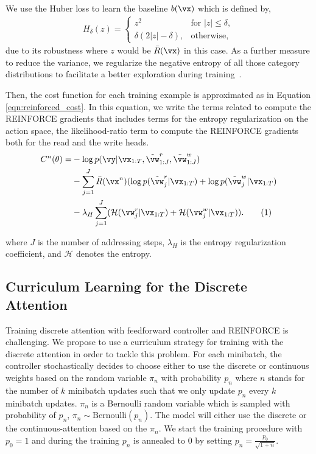 \documentclass[12pt]{article}
\newcommand\numberthis{\addtocounter{equation}{1}\tag{\theequation}}
\begin{document}
We use the Huber loss to learn the baseline $b(\vx)$ which is defined by,
\begin{align*}
    H_{\delta}(z) = 
    \begin{cases}
 {z^2}                   & \text{for } |z| \le \delta, \\
 \delta (2|z| - \delta), & \text{otherwise,}
\end{cases}
\end{align*}
due to its robustness where $z$ would be $\bar{R}(\vx)$ in this case.
As a further measure to reduce the variance, we regularize
the negative entropy of all those category distributions to facilitate a
better exploration during training~\citep{xu2015show}.

Then, the cost function for each training example is approximated as in Equation \eqref{eqn:reinforced_cost}. In this equation, we write the terms related to compute the REINFORCE gradients that includes terms for the entropy regularization on the action space, the likelihood-ratio term to compute the REINFORCE gradients both for the read and the write heads.
\begin{align*}
    C^n(\theta) =& -\log p(\vy|\vx_{1:T},
    \tilde{\vw}^r_{1:J}, \tilde{\vw}^w_{1:J}) \\
    & - \sum_{j=1}^J \bar{R}(\vx^n) (\log p(\tilde{\vw}^r_j|\vx_{1:T}) + \log p(\tilde{\vw}^w_j|\vx_{1:T})  \\
    & - \lambda_H \sum_{j=1}^J (\mathcal{H}(\vw^r_j|\vx_{1:T}) + \mathcal{H}(\vw^w_j|\vx_{1:T})).\numberthis \label{eqn:reinforced_cost}
\end{align*}


where $J$ is the number of addressing steps, $\lambda_H$ is the entropy regularization coefficient, and $\mathcal{H}$ denotes the entropy.

\subsection{Curriculum Learning for the Discrete Attention}
\label{sec:curr_disc_att}
Training discrete attention with feedforward controller and REINFORCE is challenging. We propose to use a curriculum strategy for training with the discrete attention in order to tackle this problem. For each minibatch, the controller stochastically decides to choose either to use the discrete or continuous weights based on the random variable $\pi_n$ with probability $p_n$ where $n$ stands for the number of $k$ minibatch updates such that we only update $p_n$ every $k$ minibatch updates. $\pi_n$ is a Bernoulli random variable which is sampled with probability of $p_n$, $\pi_n \sim \text{Bernoulli}(p_n)$. The model will either use the discrete or the continuous-attention based on the $\pi_n$. We start the training procedure with $p_0=1$ and during the training $p_n$ is annealed to $0$ by setting $p_n=\frac{p_0}{\sqrt{1+n}}$.
\end{document}
